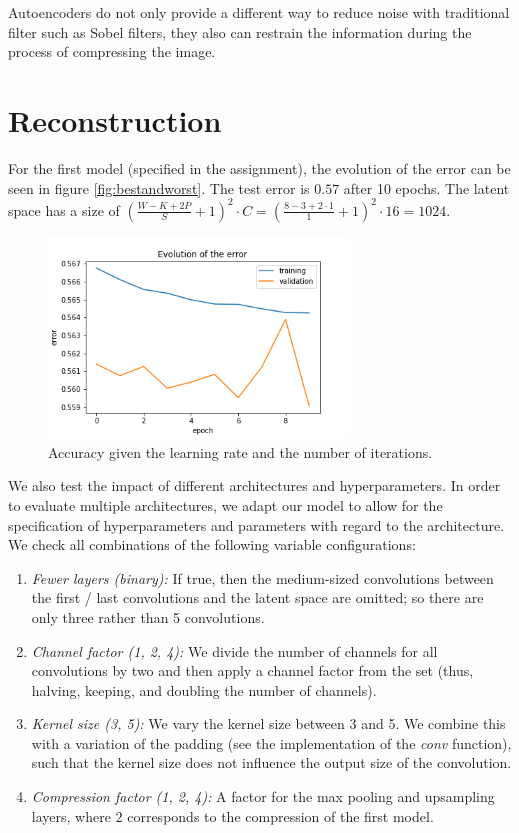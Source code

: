 \documentclass[conference]{IEEEtran}
\begin{document}
Autoencoders do not only provide a different way to reduce noise with traditional filter such as Sobel filters, they also can restrain the information during the process of compressing the image.

\section{Reconstruction}

For the first model (specified in the assignment), the evolution of the error can be seen in figure \ref{fig:bestandworst}. The test error is $0.57$ after 10 epochs. The latent space has a size of $\left(\frac{W-K+2P}{S}+1\right)^2\cdot C = \left(\frac{8-3+2\cdot 1}{1}+1\right)^2\cdot 16 = 1024$.


\begin{figure}
    \centering
    \includegraphics[width=8cm]{error_evolution_first_model.png}
    \caption{Accuracy given the learning rate and the number of iterations.}
    \label{fig:performance}
\end{figure}

We also test the impact of different architectures and hyperparameters. In order to evaluate multiple architectures, we adapt our model to allow for the specification of hyperparameters and parameters with regard to the architecture. We check all combinations of the following variable configurations:

\begin{enumerate}
    \item \textit{Fewer layers (binary):} If true, then the medium-sized convolutions between the first / last convolutions and the latent space are omitted; so there are only three rather than 5 convolutions.
    \item \textit{Channel factor (1, 2, 4):} We divide the number of channels for all convolutions by two and then apply a channel factor from the set (thus, halving, keeping, and doubling the number of channels). 
    \item \textit{Kernel size (3, 5):} We vary the kernel size between 3 and 5. We combine this with a variation of the padding (see the implementation of the \textit{conv} function), such that the kernel size does not influence the output size of the convolution.
    \item \textit{Compression factor (1, 2, 4):} A factor for the max pooling and upsampling layers, where $2$ corresponds to the compression of the first model. 
\end{enumerate}
\end{document}
